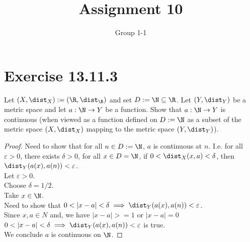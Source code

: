 \documentclass{assignment}
\title{Assignment 10}
\author{Group 1-1}
\begin{document}
\maketitle
\section{Exercise 13.11.3}
\begin{problem}
    Let $(X, \dist_X) := (\R, \dist_\R)$ and set $D:=\N\subseteq \R$. Let $(Y,\dist_Y)$ be a metric space and 
    let $a: \N \to Y$ be a function. Show that $a: \N \to Y$ is continuous (when viewed as a function defined on $D:=\N$
    as a subset of the metric space $(X, \dist_X)$ mapping to the metric space $(Y,\dist_Y)$).
\end{problem}
\begin{proof}
    Need to show that for all $n \in D:=\N$, $a$ is continuous at $n$. I.e. for all $\varepsilon > 0$, there exists $\delta > 0$,
    for all $x \in D=\N$, if $0 < \dist_X(x,a) < \delta$, then $\dist_Y(a(x),a(n)) < \varepsilon$. \\
    Let $\varepsilon > 0$. \\
    Choose $\delta = 1/2$. \\
    Take $x \in \N$. \\
    Need to show that $0 < |x-a| < \delta \implies \dist_Y(a(x),a(n)) < \varepsilon$. \\
    Since $x,a \in N$ and, we have $|x-a|>=1$ or $|x-a|=0$\\ 
    $0 < |x-a| < \delta \implies \dist_Y(a(x),a(n)) < \varepsilon$ is true. \\
    We conclude $a$ is continuous on $\N$.
\end{proof}
\end{document}
